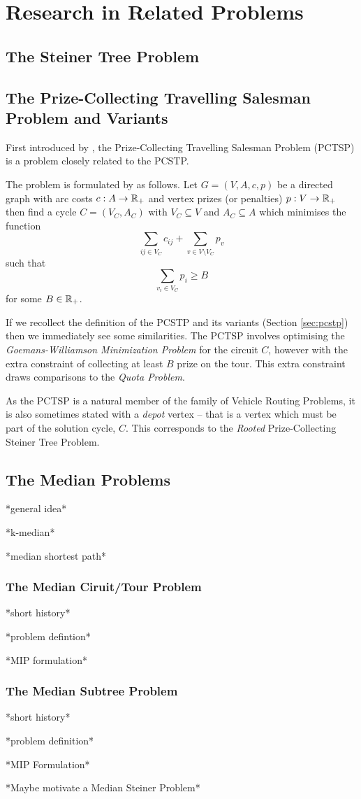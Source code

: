 \chapter{Research in Related Problems}
\label{chap:related}


\section{The Steiner Tree Problem}

\section{The Prize-Collecting Travelling Salesman Problem and Variants}
First introduced by \citet*{balas1989prize}, the Prize-Collecting Travelling Salesman Problem
(PCTSP) is a problem closely related to the
PCSTP.

The problem is formulated by \citeauthor{balas1989prize} as follows. Let
$G = (V, A, c, p)$ be a directed
graph with arc costs $c: A \to \mathbb{R}_+$ and vertex prizes (or penalties) $p: V \to \mathbb{R}_+$
then find a cycle $C = (V_C, A_C)$ with $V_C \subseteq V$ and $A_C \subseteq A$ which
minimises the function
$$\sum_{ij \in V_C} c_{ij} + \sum_{v \in V \setminus V_C} p_v$$
such that
$$\sum_{v_i \in V_C} p_i \geq B$$
for some $B \in \mathbb{R}_+$.

If we recollect the definition of the PCSTP and its variants (Section \ref{sec:pcstp}) then
we immediately see some similarities. The PCTSP involves optimising the
\textit{Goemans-Williamson Minimization Problem} for the circuit $C$, however with the extra
constraint of collecting at least $B$ prize on the tour. This extra constraint draws comparisons
to the \textit{Quota Problem}.

As the PCTSP is a natural member of the family of Vehicle Routing Problems, it is also sometimes
stated with a \textit{depot} vertex \citep{feillet2005traveling} -- that is a vertex which
must be part of the solution cycle, $C$. This corresponds to the \textit{Rooted}
 Prize-Collecting Steiner Tree Problem.
 \section{The Median  Problems}
 *general idea*
 
 *k-median*
 
 *median shortest path*
\subsection{The Median Ciruit/Tour Problem}
*short history*

*problem defintion*

*MIP formulation*
\subsection{The Median Subtree Problem}
*short history*

*problem definition*

*MIP Formulation*

*Maybe motivate a Median Steiner Problem*


